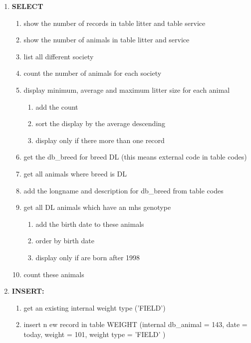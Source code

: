 \documentclass[10pt,a4paper,DIV14]{scrartcl}
\begin{document}
\begin{enumerate}
\item {\bf SELECT}
\begin{enumerate}
\item show the number of records in table litter and table service
\item show the number of animals in table litter and service
\item list all different society
\item count the number of animals for each society
\item display minimum, average and maximum litter size for each animal
  \begin{enumerate}
  \item add the count
  \item sort the display by the average descending
  \item display only if there more than one record
  \end{enumerate}
\item get the db\_breed for breed DL (this means external code in
  table codes)
\item get all animals where breed is DL
\item add the longname and description for db\_breed from table codes
\item get all DL animals which have an mhs genotype
  \begin{enumerate}
  \item add the birth date to these animals 
  \item order by birth date
  \item display only if are born after 1998
  \end{enumerate}
\item count these animals
\end{enumerate}

\item {\bf INSERT:}
\begin{enumerate}
\item get an existing internal weight type ('FIELD')
\item insert n
ew record in table WEIGHT (internal db\_animal = 143,
  date = today, weight = 101, weight type = 'FIELD' )
\end{enumerate}


\end{enumerate}
\end{document}
